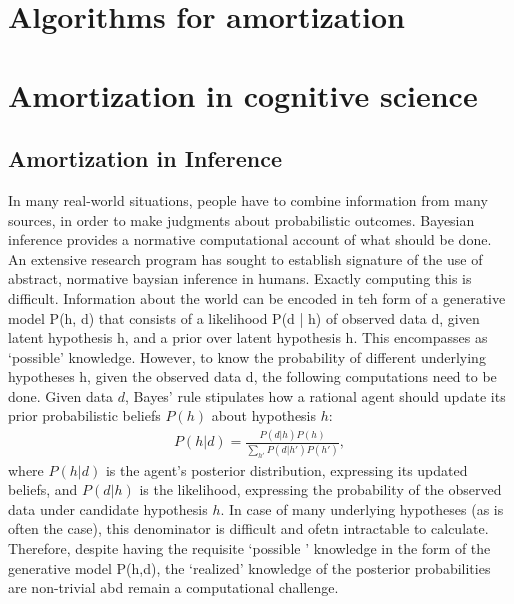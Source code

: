 % 

\section{Algorithms for amortization}


\section{Amortization in cognitive science}

\subsection{Amortization in Inference}

In many real-world situations, people have to combine information from many sources, in order to make judgments about probabilistic outcomes. Bayesian inference provides a normative computational account of what should be done. An extensive research program has sought to establish signature of the use of abstract, normative baysian inference in humans. Exactly computing this is difficult. Information about the world can be encoded in teh form of a generative model P(h, d) that consists of a likelihood P(d | h) of observed data d, given latent hypothesis h, and a prior over latent hypothesis h. This encompasses as `possible' knowledge. However, to know the probability of different underlying hypotheses h, given the observed data d, the following computations need to be done.
Given data $d$, Bayes' rule stipulates how a rational agent should update its prior probabilistic beliefs $P(h)$ about hypothesis $h$:
\begin{align}
    P(h|d) = \frac{P(d|h)P(h)}{\sum_{h'} P(d|h') P(h')},
\end{align}
where $P(h|d)$ is the agent's posterior distribution, expressing its updated beliefs, and $P(d|h)$ is the likelihood, expressing the probability of the observed data under candidate hypothesis $h$. In case of many underlying hypotheses (as is often the case), this denominator is difficult and ofetn intractable to calculate. Therefore, despite having the requisite `possible ' knowledge in the form of the generative model P(h,d), the `realized' knowledge of the posterior probabilities are non-trivial abd remain a computational challenge.

